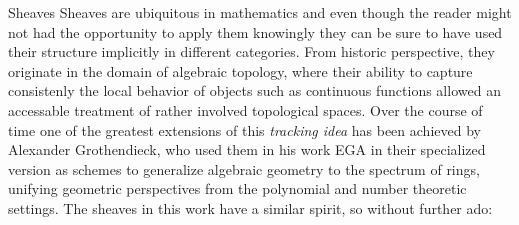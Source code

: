 \begin{section}{Sheaves}
Sheaves are ubiquitous in mathematics and even though the reader might not had the opportunity
to apply them knowingly they can be sure to have used their structure implicitly in different categories.
From historic perspective, they originate in the domain of algebraic topology, where their ability to capture
consistenly the local behavior of objects such as continuous functions allowed an accessable
treatment of rather involved topological spaces. Over the course of time one of the greatest 
extensions of this \textit{tracking idea} has been achieved by Alexander Grothendieck, who used
them in his work EGA \cite{egatransl} in their specialized version as schemes to generalize algebraic geometry to the spectrum 
of rings, unifying geometric perspectives from the polynomial and number theoretic settings.
The sheaves in this work have a similar spirit, so without further ado:


\end{section}
